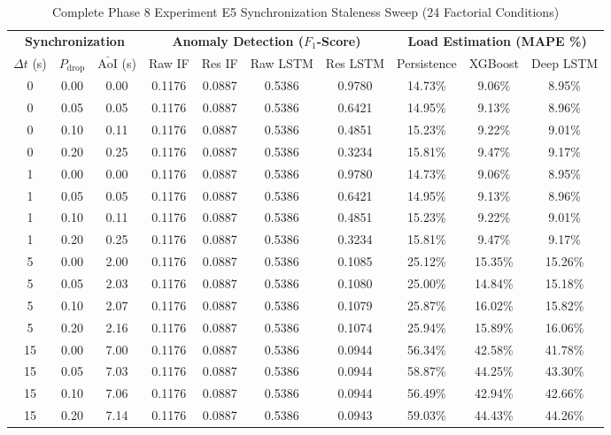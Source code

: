 \begin{table}[htbp]
\centering
\caption{Complete Phase 8 Experiment E5 Synchronization Staleness Sweep (24 Factorial Conditions)}
\label{tab:e5_condition_summary}
\small
\begin{tabular}{ccc|cccc|ccc}
\hline
\multicolumn{3}{c|}{\textbf{Synchronization}} & \multicolumn{4}{c|}{\textbf{Anomaly Detection ($F_1$-Score)}} & \multicolumn{3}{c}{\textbf{Load Estimation (MAPE \%)}} \\
$\Delta t$ (s) & $P_{\text{drop}}$ & $\bar{\text{AoI}}$ (s) & Raw IF & Res IF & Raw LSTM & Res LSTM & Persistence & XGBoost & Deep LSTM \\
\hline
0 & 0.00 & 0.00 & 0.1176 & 0.0887 & 0.5386 & 0.9780 & 14.73\% & 9.06\% & 8.95\% \\
0 & 0.05 & 0.05 & 0.1176 & 0.0887 & 0.5386 & 0.6421 & 14.95\% & 9.13\% & 8.96\% \\
0 & 0.10 & 0.11 & 0.1176 & 0.0887 & 0.5386 & 0.4851 & 15.23\% & 9.22\% & 9.01\% \\
0 & 0.20 & 0.25 & 0.1176 & 0.0887 & 0.5386 & 0.3234 & 15.81\% & 9.47\% & 9.17\% \\
1 & 0.00 & 0.00 & 0.1176 & 0.0887 & 0.5386 & 0.9780 & 14.73\% & 9.06\% & 8.95\% \\
1 & 0.05 & 0.05 & 0.1176 & 0.0887 & 0.5386 & 0.6421 & 14.95\% & 9.13\% & 8.96\% \\
1 & 0.10 & 0.11 & 0.1176 & 0.0887 & 0.5386 & 0.4851 & 15.23\% & 9.22\% & 9.01\% \\
1 & 0.20 & 0.25 & 0.1176 & 0.0887 & 0.5386 & 0.3234 & 15.81\% & 9.47\% & 9.17\% \\
5 & 0.00 & 2.00 & 0.1176 & 0.0887 & 0.5386 & 0.1085 & 25.12\% & 15.35\% & 15.26\% \\
5 & 0.05 & 2.03 & 0.1176 & 0.0887 & 0.5386 & 0.1080 & 25.00\% & 14.84\% & 15.18\% \\
5 & 0.10 & 2.07 & 0.1176 & 0.0887 & 0.5386 & 0.1079 & 25.87\% & 16.02\% & 15.82\% \\
5 & 0.20 & 2.16 & 0.1176 & 0.0887 & 0.5386 & 0.1074 & 25.94\% & 15.89\% & 16.06\% \\
15 & 0.00 & 7.00 & 0.1176 & 0.0887 & 0.5386 & 0.0944 & 56.34\% & 42.58\% & 41.78\% \\
15 & 0.05 & 7.03 & 0.1176 & 0.0887 & 0.5386 & 0.0944 & 58.87\% & 44.25\% & 43.30\% \\
15 & 0.10 & 7.06 & 0.1176 & 0.0887 & 0.5386 & 0.0944 & 56.49\% & 42.94\% & 42.66\% \\
15 & 0.20 & 7.14 & 0.1176 & 0.0887 & 0.5386 & 0.0943 & 59.03\% & 44.43\% & 44.26\% \\

\end{tabular}
\end{table}
